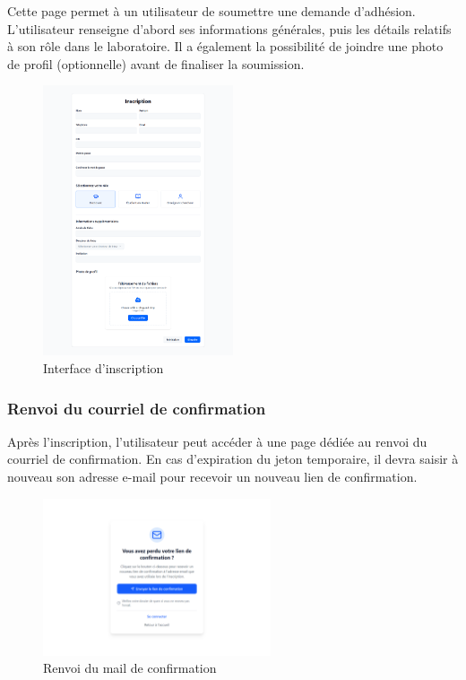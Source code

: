 Cette page permet à un utilisateur de soumettre une demande d’adhésion. L'utilisateur renseigne d’abord ses informations générales, puis les détails relatifs à son rôle dans le laboratoire. Il a également la possibilité de joindre une photo de profil (optionnelle) avant de finaliser la soumission.

\begin{figure}[H]
    \centering
    \includegraphics[width=0.5\textwidth]{images/interface/inscription.png}
    \caption{Interface d’inscription}
    \label{fig:inscription}
\end{figure}

\subsubsection{Renvoi du courriel de confirmation}

Après l’inscription, l’utilisateur peut accéder à une page dédiée au renvoi du courriel de confirmation. En cas d’expiration du jeton temporaire, il devra saisir à nouveau son adresse e-mail pour recevoir un nouveau lien de confirmation.

\begin{figure}[H]
    \centering
    \includegraphics[width=0.6\textwidth]{images/interface/renvoie_mail.png}
    \caption{Renvoi du mail de confirmation}
    \label{fig:renvoie_mail}
\end{figure}

